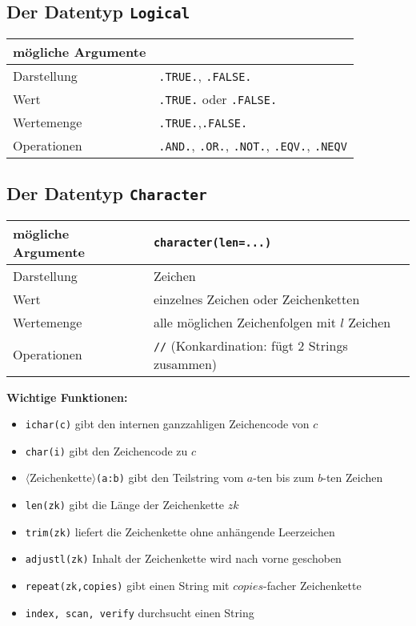 \subsection{Der Datentyp \texttt{Logical}}
	\begin{tabular}{l|l}
		mögliche Argumente & \\
		\hline
		Darstellung & \texttt{.TRUE.}, \texttt{.FALSE.} \\
		\hline
		Wert & \texttt{.TRUE.} oder \texttt{.FALSE.} \\
		\hline
		Wertemenge & {\texttt{.TRUE.},\texttt{.FALSE.}} \\
		\hline
		Operationen & \texttt{.AND.}, \texttt{.OR.}, \texttt{.NOT.}, \texttt{.EQV.}, \texttt{.NEQV}
	\end{tabular}

\subsection{Der Datentyp \texttt{Character}}
	\begin{tabular}{l|l}
		mögliche Argumente & \texttt{character(len=...)} \\
		\hline
		Darstellung & Zeichen \\
		\hline
		Wert & einzelnes Zeichen oder Zeichenketten \\
		\hline
		Wertemenge & alle möglichen Zeichenfolgen mit $l$ Zeichen \\
		\hline
		Operationen & \texttt{//} (Konkardination: fügt 2 Strings zusammen)
	\end{tabular}

\textbf{Wichtige Funktionen:}
\begin{itemize}
	\item\texttt{ichar(c)} gibt den internen ganzzahligen Zeichencode von $c$
	\item\texttt{char(i)} gibt den Zeichencode zu $c$
	\item $\langle\text{Zeichenkette}\rangle$\texttt{(a:b)} gibt den Teilstring vom $a$-ten bis zum $b$-ten Zeichen
	\item\texttt{len(zk)} gibt die Länge der Zeichenkette $zk$
	\item\texttt{trim(zk)} liefert die Zeichenkette ohne anhängende Leerzeichen
	\item\texttt{adjustl(zk)} Inhalt der Zeichenkette wird nach vorne geschoben
	\item\texttt{repeat(zk,copies)} gibt einen String mit $copies$-facher Zeichenkette
	\item\texttt{index, scan, verify} durchsucht einen String
\end{itemize}

